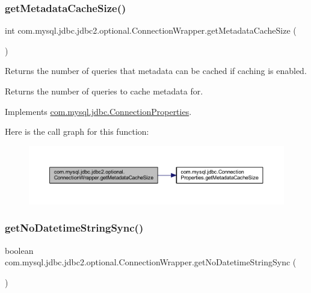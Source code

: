 \subsubsection{\texorpdfstring{get\+Metadata\+Cache\+Size()}{getMetadataCacheSize()}}
{\footnotesize\ttfamily int com.\+mysql.\+jdbc.\+jdbc2.\+optional.\+Connection\+Wrapper.\+get\+Metadata\+Cache\+Size (\begin{DoxyParamCaption}{ }\end{DoxyParamCaption})}

Returns the number of queries that metadata can be cached if caching is enabled.

\begin{DoxyReturn}{Returns}
the number of queries to cache metadata for. 
\end{DoxyReturn}


Implements \mbox{\hyperlink{interfacecom_1_1mysql_1_1jdbc_1_1_connection_properties_a980b503e0c8bf4b37a666526770ad043}{com.\+mysql.\+jdbc.\+Connection\+Properties}}.

Here is the call graph for this function\+:
\nopagebreak
\begin{figure}[H]
\begin{center}
\leavevmode
\includegraphics[width=350pt]{classcom_1_1mysql_1_1jdbc_1_1jdbc2_1_1optional_1_1_connection_wrapper_a0bb63d0913c6fafbbbb5cfdd3ba55521_cgraph}
\end{center}
\end{figure}
\mbox{\label{classcom_1_1mysql_1_1jdbc_1_1jdbc2_1_1optional_1_1_connection_wrapper_aa17bed727b36f4557e32e581a7abff7f}} 
\subsubsection{\texorpdfstring{get\+No\+Datetime\+String\+Sync()}{getNoDatetimeStringSync()}}
{\footnotesize\ttfamily boolean com.\+mysql.\+jdbc.\+jdbc2.\+optional.\+Connection\+Wrapper.\+get\+No\+Datetime\+String\+Sync (\begin{DoxyParamCaption}{ }\end{DoxyParamCaption})}


